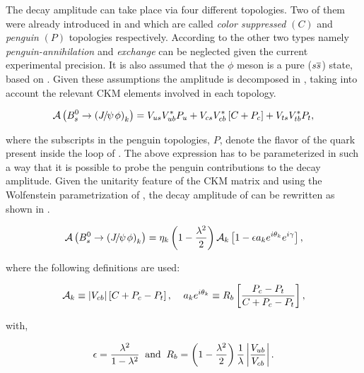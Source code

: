 The \BsJpsiPhi decay amplitude can take place via four different topologies.
Two of them were already introduced in  and  which are called {\it color suppressed }$(C)$ and {\it penguin} $(P)$
topologies respectively. According to \cite{DeBruyn-thesis} the other two types namely {\it penguin-annihilation} and {\it exchange} can be neglected
given the current experimental precision. It is also assumed that the $\phi$ meson is a pure ($s\overline {s}$) state, based on \cite{Faller:2008gt}.
Given these assumptions the \BsJpsiPhi amplitude is decomposed in , taking into account the relevant CKM elements involved in each topology.

\begin{equation}
\mathcal{A} \left( B^0_s\rightarrow \left({J\mskip -3mu/\mskip -2mu\psi\mskip 2mu} \phi\right)_{k} \right) = V_{us}V_{ub}^*P_{u} + V_{cs}V_{cb}^*\left[ C +P_{c} \right] + V_{ts}V_{tb}^*P_{t},
 \label{bsjpsiphi_amp}
\end{equation}

\noindent where the subscripts in the penguin topologies, $P$, denote the flavor of the quark present inside the loop of .
The above expression has to be parameterized in such a way that it is possible to probe the penguin contributions to
the \BsJpsiPhi decay amplitude. Given the unitarity feature of the CKM matrix and using the Wolfenstein parametrization
of , the decay amplitude of  can be rewritten as shown in .

\begin{equation}
  \mathcal{A} \left( B^0_s\rightarrow \left({J\mskip -3mu/\mskip -2mu\psi\mskip 2mu} \phi\right)_{k} \right) = \eta_k  \left( 1-\frac{\lambda^2}{2} \right) \mathcal{A}_{k} \left[  1 - \epsilon a_k e^{i\theta_k} e^{i\gamma}  \right],
 \label{bsjpsiphi_amp_param}
\end{equation}

\noindent where the following definitions are used:

\begin{equation}
  \mathcal{A}_{k} \equiv |V_{cb}| \left[ C + P_c - P_t \right], \;\;\;\; a_k e^{i\theta_k} \equiv R_b \left[  \frac{P_c - P_t}{C + P_c - P_t}  \right],
  \label{bsjpsiphi_amp_param_defs}
\end{equation}

\noindent with,

\begin{equation}
  \epsilon = \frac{\lambda^2}{1-\lambda^2} \;\;\text{and} \;\;  R_b = \left( 1-\frac{\lambda^2}{2} \right) \frac{1}{\lambda} \left| \frac{V_{ub}}{V_{cb}} \right|.
  \label{bsjpsiphi_amp_param_defs_II}
\end{equation}


